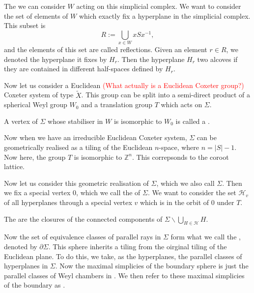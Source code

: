 \documentclass[11pt]{article}
\begin{document}
The we can consider $W$ acting on this simplicial complex.
We want to consider the set of elements of $W$ which exactly fix a hyperplane in the simplicial complex. This subset is
\[R:=\bigcup_{x\in W}xSx^{-1},\]
and the elements of this set are called reflections. Given an element $r\in R$, we denoted the hyperplane it fixes by $H_r$. Then the hyperplane $H_r$  two alcoves if they are contained in different half-spaces defined by $H_r$. 

Now let us consider a Euclidean \textcolor{red}{(What actually is a Euclidean Coxeter group?)} Coxeter system of type $\tilde{X}$. This group can be split into a semi-direct product of a spherical Weyl group $W_0$ and a translation group $T$ which acts on $\Sigma$.
\begin{definition}
    A vertex of $\Sigma$ whose stabiliser in $W$ is isomorphic to $W_0$ is called a .
\end{definition}

Now when we have an irreducible Euclidean Coxeter system, $\Sigma$ can be geometrically realised as a tiling of the Euclidean $n$-space, where $n=|S|-1$. Now here, the group $T$ is isomorphic to $\mathbb{Z}^n$. This correpsonds to the coroot lattice. 

Now let us consider this geometric realisation of $\Sigma$, which we also call $\Sigma$. Then we fix a special vertex 0, which we call the  of $\Sigma$. We want to consider the set $\mathcal{H}_v$ of all hyperplanes through a special vertex $v$ which is in the orbit of 0 under $T$. 

\begin{definition}
    The  are the closures of the connected components of $\Sigma\backslash \bigcup_{H\in\mathcal{H}}H$.
\end{definition}

Now the set of equivalence classes of parallel rays in $\Sigma$ form what we call the , denoted by $\partial\Sigma$. This sphere inherits a tiling from the oirginal tiling of the Euclidean plane. To do this, we take, as the hyperplanes, the parallel classes of hyperplanes in $\Sigma$. 
Now the maximal simplicies of the boundary sphere is just the parallel classes of Weyl chambers in \sg. We then refer to these maximal simplicies of the boundary as .

\end{document}
